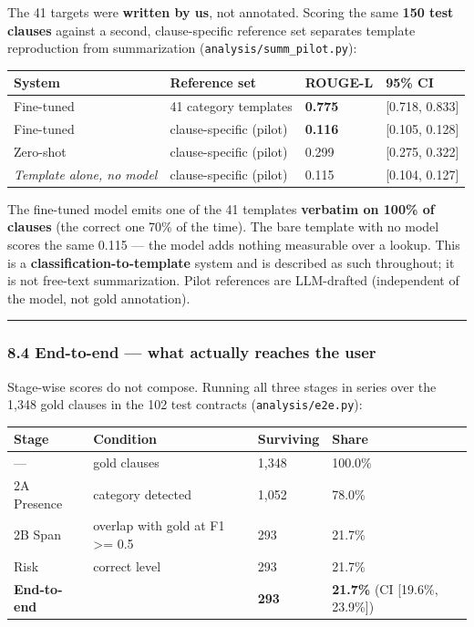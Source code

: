 \documentclass[
  10pt,
]{article}
\begin{document}
The 41 targets were \textbf{written by us}, not annotated. Scoring the same
\textbf{150 test clauses} against a second, clause-specific reference set
separates template reproduction from summarization
(\texttt{analysis/summ\_pilot.py}):

\begin{longtable}[]{@{}llll@{}}
\toprule
System & Reference set & ROUGE-L & 95\% CI \\
\midrule
\endhead
Fine-tuned & 41 category templates & \textbf{0.775} & {[}0.718, 0.833{]} \\
Fine-tuned & clause-specific (pilot) & \textbf{0.116} & {[}0.105, 0.128{]} \\
Zero-shot & clause-specific (pilot) & 0.299 & {[}0.275, 0.322{]} \\
\emph{Template alone, no model} & clause-specific (pilot) & 0.115 & {[}0.104,
0.127{]} \\
\bottomrule
\end{longtable}

The fine-tuned model emits one of the 41 templates \textbf{verbatim on 100\% of
clauses} (the correct one 70\% of the time). The bare template with no model
scores the same 0.115 --- the model adds nothing measurable over a lookup. This
is a \textbf{classification-to-template} system and is described as such
throughout; it is not free-text summarization. Pilot references are LLM-drafted
(independent of the model, not gold annotation).

\begin{center}\rule{0.5\linewidth}{0.5pt}\end{center}

\subsubsection{8.4 End-to-end --- what actually reaches the user}

Stage-wise scores do not compose. Running all three stages in series over the
1,348 gold clauses in the 102 test contracts (\texttt{analysis/e2e.py}):

\begin{longtable}[]{@{}llll@{}}
\toprule
Stage & Condition & Surviving & Share \\
\midrule
\endhead
--- & gold clauses & 1,348 & 100.0\% \\
2A Presence & category detected & 1,052 & 78.0\% \\
2B Span & overlap with gold at F1 \textgreater= 0.5 & 293 & 21.7\% \\
Risk & correct level & 293 & 21.7\% \\
\textbf{End-to-end} & & \textbf{293} & \textbf{21.7\%} (CI {[}19.6\%,
23.9\%{]}) \\
\bottomrule
\end{longtable}
\end{document}
